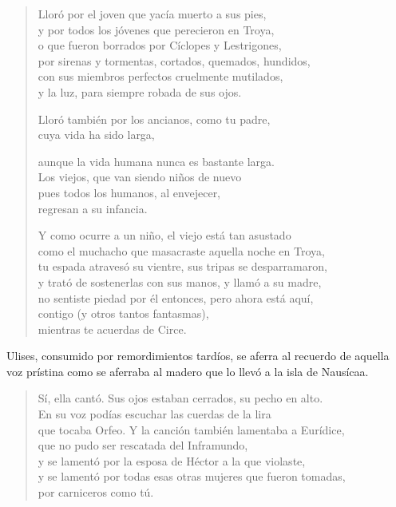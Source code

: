 \begin{verse}
Lloró por el joven que yacía muerto a sus pies,\\
y por todos los jóvenes que perecieron en Troya,\\
o que fueron borrados por Cíclopes y Lestrigones,\\
por sirenas y tormentas, cortados, quemados, hundidos,\\
con sus miembros perfectos cruelmente mutilados,\\
y la luz, para siempre robada de sus ojos.

Lloró también por los ancianos, como tu padre,\\
cuya vida ha sido larga,

aunque la vida humana nunca es bastante larga.\\
Los viejos, que van siendo niños de nuevo\\
pues todos los humanos, al envejecer,\\
regresan a su infancia.

Y como ocurre a un niño, el viejo está tan asustado\\
como el muchacho que masacraste aquella noche en Troya,\\
tu espada atravesó su vientre, sus tripas se desparramaron,\\
y trató de sostenerlas con sus manos, y llamó a su madre,\\
no sentiste piedad por él entonces, pero ahora está aquí,\\
contigo (y otros tantos fantasmas),\\
mientras te acuerdas de Circe.
\end{verse}

Ulises, consumido por remordimientos tardíos, se aferra al recuerdo de aquella voz prístina como se aferraba al madero que lo llevó a la isla de Nausícaa.

\begin{verse}
Sí, ella cantó. Sus ojos estaban cerrados, su pecho en alto.\\
En su voz podías escuchar las cuerdas de la lira\\
que tocaba Orfeo. Y la canción también lamentaba a Eurídice,\\
que no pudo ser rescatada del Inframundo,\\
y se lamentó por la esposa de Héctor a la que violaste,\\
y se lamentó por todas esas otras mujeres que fueron tomadas,\\
por carniceros como tú.
\end{verse}

